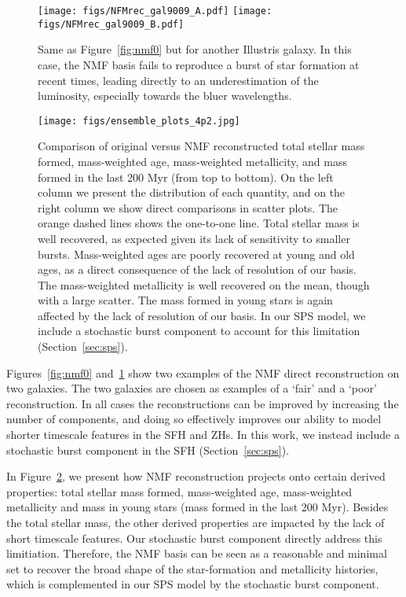 \begin{figure}
\begin{center}
\texttt{[image: figs/NFMrec\_gal9009\_A.pdf]}
\texttt{[image: figs/NFMrec\_gal9009\_B.pdf]}
    \caption{
    Same as Figure~\ref{fig:nmf0} but for another Illustris galaxy. 
    In this case, the NMF basis fails to reproduce a burst of star formation at
    recent times, leading directly to an underestimation of the luminosity,
    especially towards the bluer wavelengths.
    }\label{fig:nmf1}
\end{center}
\end{figure}

\begin{figure}
\begin{center}
\texttt{[image: figs/ensemble\_plots\_4p2.jpg]}
    \caption{
    Comparison of original versus NMF reconstructed total stellar mass formed,
    mass-weighted age, mass-weighted metallicity, and mass formed in the last
    200 Myr (from top to bottom). 
    On the left column we present the distribution of each quantity, and on the
    right column we show direct comparisons in scatter plots. 
    The orange dashed lines shows the one-to-one line.
    Total stellar mass is well recovered, as expected given its lack of
    sensitivity to smaller bursts. 
    Mass-weighted ages are poorly recovered at young and old ages, as a direct
    consequence of the lack of resolution of our basis.
    The mass-weighted metallicity is well recovered on the mean, though with a
    large scatter. 
    The mass formed in young stars is again affected by the lack of resolution
    of our basis. 
    In our SPS model, we include a stochastic burst component to account for
    this limitation (Section~\ref{sec:sps}). 
    }\label{fig:nmf2}
\end{center}
\end{figure}

Figures~\ref{fig:nmf0} and~\ref{fig:nmf1} show two examples of the NMF direct
reconstruction on two galaxies. 
The two galaxies are chosen as examples of a `fair' and a `poor' reconstruction.
In all cases the reconstructions can be improved by increasing the number of
components, and doing so effectively improves our ability to model shorter
timescale features in the SFH and ZHs.
In this work, we instead include a stochastic burst component in the SFH
(Section~\ref{sec:sps}). 

In Figure~\ref{fig:nmf2}, we present how NMF reconstruction projects onto
certain derived properties: total stellar mass formed, mass-weighted age,
mass-weighted metallicity and mass in young stars (mass formed in the last 200
Myr).
Besides the total stellar mass, the other derived properties are impacted by
the lack of short timescale features. 
Our stochastic burst component directly address this limitiation. 
Therefore, the NMF basis can be seen as a reasonable and minimal set to recover
the broad shape of the star-formation and metallicity histories, which is
complemented in our SPS model by the stochastic burst component.
